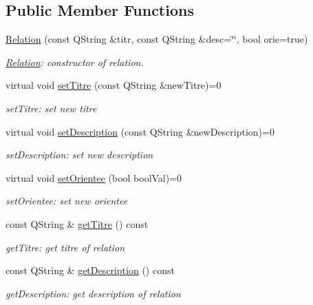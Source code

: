 \subsection*{Public Member Functions}
\begin{DoxyCompactItemize}
\item 
\hyperlink{class_relation_a2e93c9b24ab0748753655bdceb523d68}{Relation} (const Q\+String \&titr, const Q\+String \&desc=\char`\"{}\char`\"{}, bool orie=true)
\begin{DoxyCompactList}\small\item\em \hyperlink{class_relation}{Relation}\+: constructor of relation. \end{DoxyCompactList}\item 
virtual void \hyperlink{class_relation_a1c08a802796f5fccaa5732ec1a96e542}{set\+Titre} (const Q\+String \&new\+Titre)=0
\begin{DoxyCompactList}\small\item\em set\+Titre\+: set new titre \end{DoxyCompactList}\item 
virtual void \hyperlink{class_relation_a8f698cc45c38a849c4bcd8336fa5e2b3}{set\+Description} (const Q\+String \&new\+Description)=0
\begin{DoxyCompactList}\small\item\em set\+Description\+: set new description \end{DoxyCompactList}\item 
virtual void \hyperlink{class_relation_a5c93cf0ba3f16e75b83f3683b5ac26ec}{set\+Orientee} (bool bool\+Val)=0
\begin{DoxyCompactList}\small\item\em set\+Orientee\+: set new orientee \end{DoxyCompactList}\item 
const Q\+String \& \hyperlink{class_relation_a411be3a1dfc417342db768555a2afe41}{get\+Titre} () const
\begin{DoxyCompactList}\small\item\em get\+Titre\+: get titre of relation \end{DoxyCompactList}\item 
const Q\+String \& \hyperlink{class_relation_a078c6c43b163152aa40a9ac535175b9e}{get\+Description} () const
\begin{DoxyCompactList}\small\item\em get\+Description\+: get description of relation \end{DoxyCompactList}\item 

\end{DoxyCompactItemize}
